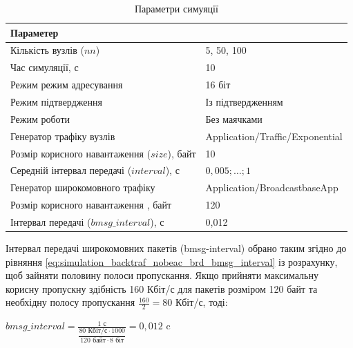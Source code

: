 \documentclass[a4paper,ukrainian,utf8,nocolumnsxix,floatsection,equationsection]{eskdtext}
\begin{document}
\begin{table}[htbp]
\caption{Параметри симуяції}
\centering
\begin{tabular}{|l|l|}
	\hline
	Параметер                                    &                                 \\ \hline
	Кількість вузлів ($nn$)                      & 5, 50, 100                      \\ \hline
	Час симуляції, с                             & 10                              \\ \hline
	Режим режим адресування                      & 16 біт                          \\ \hline
	Режим підтвердження                          & Із підтвердженням               \\ \hline
	Режим роботи                                 & Без маячками                    \\ \hline
	Генератор трафіку вузлів                     & Application/Traffic/Exponential \\ \hline
	Розмір корисного навантаження ($size$), байт & 10                              \\ \hline
	Середній інтервал передачі ($interval$), с   & $0,005;\dots;1$                 \\ \hline
	Генератор широкомовного трафіку              & Application/BroadcastbaseApp    \\ \hline
	Розмір корисного навантаження , байт         & 120                             \\ \hline
	Інтервал передачі ($bmsg\_interval$), с      & 0,012                           \\ \hline
\end{tabular}
\label{tbl:simulation_backtraf_nobeac_brd}
\end{table}

Інтервал передачі широкомовних пакетів (bmsg-interval) обрано таким згідно до рівняння \ref{eq:simulation_backtraf_nobeac_brd_bmsg_interval} із розрахунку, щоб зайняти половину полоси пропускання. Якщо прийняти максимальну корисну пропускну здібність 160 Кбіт/с для пакетів розміром 120 байт та необхідну полосу пропускання $\frac{160}{2}=80$ Кбіт/с, тоді:

$	bmsg\_interval = \frac{1 \text{ с}}{\dfrac{80 \text{ Кбіт/с} \cdot 1000}{120 \text{ байт} \cdot 8 \text{ біт}}} = 0,012 \text{ c}$
\end{document}

